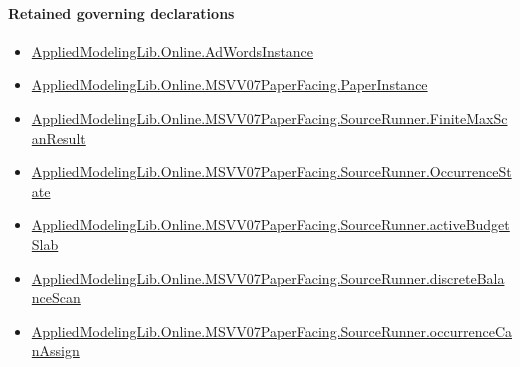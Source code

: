 \documentclass[10pt]{article}
\begin{document}
\paragraph{Retained governing declarations}
\begin{itemize}\raggedright
\item \hyperlink{governing-declaration-e5ce49672bf26ab1}{Applied\allowbreak{}Modeling\allowbreak{}Lib.\allowbreak{}Online.\allowbreak{}Ad\allowbreak{}Words\allowbreak{}Instance}
\item \hyperlink{governing-declaration-11907576ec71eeb5}{Applied\allowbreak{}Modeling\allowbreak{}Lib.\allowbreak{}Online.\allowbreak{}MSVV07\allowbreak{}Paper\allowbreak{}Facing.\allowbreak{}Paper\allowbreak{}Instance}
\item \hyperlink{governing-declaration-ebb7db2383e5a26e}{Applied\allowbreak{}Modeling\allowbreak{}Lib.\allowbreak{}Online.\allowbreak{}MSVV07\allowbreak{}Paper\allowbreak{}Facing.\allowbreak{}Source\allowbreak{}Runner.\allowbreak{}Finite\allowbreak{}Max\allowbreak{}Scan\allowbreak{}Result}
\item \hyperlink{governing-declaration-2eff7815f49c1d41}{Applied\allowbreak{}Modeling\allowbreak{}Lib.\allowbreak{}Online.\allowbreak{}MSVV07\allowbreak{}Paper\allowbreak{}Facing.\allowbreak{}Source\allowbreak{}Runner.\allowbreak{}Occurrence\allowbreak{}State}
\item \hyperlink{paper-prerequisite-84b93a2351446dd2}{Applied\allowbreak{}Modeling\allowbreak{}Lib.\allowbreak{}Online.\allowbreak{}MSVV07\allowbreak{}Paper\allowbreak{}Facing.\allowbreak{}Source\allowbreak{}Runner.\allowbreak{}active\allowbreak{}Budget\allowbreak{}Slab}
\item \hyperlink{paper-prerequisite-67f443bf0ff68608}{Applied\allowbreak{}Modeling\allowbreak{}Lib.\allowbreak{}Online.\allowbreak{}MSVV07\allowbreak{}Paper\allowbreak{}Facing.\allowbreak{}Source\allowbreak{}Runner.\allowbreak{}discrete\allowbreak{}Balance\allowbreak{}Scan}
\item \hyperlink{governing-declaration-54a700f2397309bc}{Applied\allowbreak{}Modeling\allowbreak{}Lib.\allowbreak{}Online.\allowbreak{}MSVV07\allowbreak{}Paper\allowbreak{}Facing.\allowbreak{}Source\allowbreak{}Runner.\allowbreak{}occurrence\allowbreak{}Can\allowbreak{}Assign}
\end{itemize}
\end{document}
